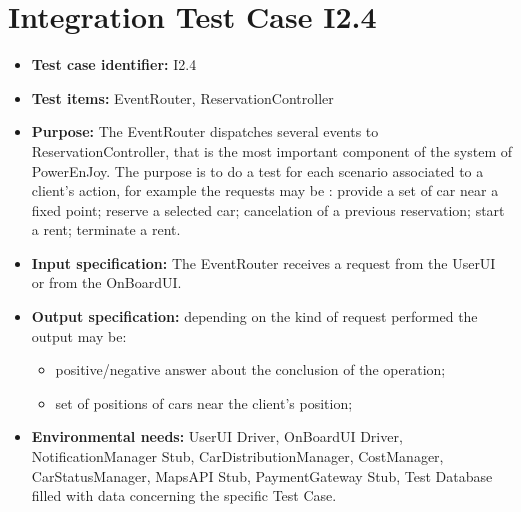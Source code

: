 \section{Integration Test Case I2.4}
\begin{itemize}
\item \textbf{Test case identifier:} I2.4
\item \textbf{Test items:} EventRouter, ReservationController
\item \textbf{Purpose:} The EventRouter dispatches several events to ReservationController, that is the most important component of the system of PowerEnJoy. The purpose is to do a test for each scenario associated to a client’s action, for example the requests may be : provide a set of car near a fixed point; reserve a selected car; cancelation of a previous reservation; start a rent; terminate a rent.
\item \textbf{Input specification:} The EventRouter receives a request from the UserUI or from the OnBoardUI.
\item \textbf{Output specification:} depending on the kind of request performed the output may be:
\begin{itemize}
\item positive/negative answer about the conclusion of the operation;
\item set of positions of cars near the client’s position;
\end{itemize}
\item \textbf{Environmental needs:} UserUI Driver, OnBoardUI Driver, NotificationManager Stub, CarDistributionManager, CostManager, CarStatusManager, MapsAPI Stub, PaymentGateway Stub, Test Database filled with data concerning the specific Test Case.
\end{itemize}

